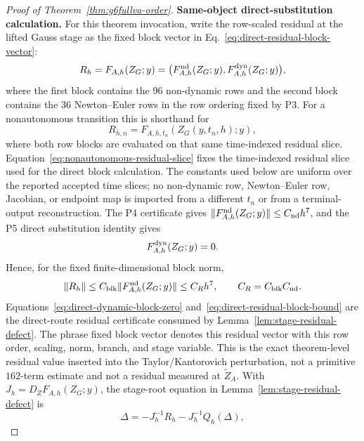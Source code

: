 \documentclass[preprint,12pt]{elsarticle}
\begin{document}
\begin{proof}[Proof of Theorem~\ref{thm:g6fullva-order}]
\noindent\textbf{Same-object direct-substitution calculation.}
For this theorem invocation, write the row-scaled residual at the lifted
Gauss stage as the fixed block vector in
Eq.~\eqref{eq:direct-residual-block-vector}:
\begin{equation}
\label{eq:direct-residual-block-vector}
  R_h=F_{A,h}(Z_G;y)
  =\big(F^{\rm nd}_{A,h}(Z_G;y),F^{\rm dyn}_{A,h}(Z_G;y)\big),
\end{equation}
where the first block contains the 96 non-dynamic rows and the second block
contains the 36 Newton--Euler rows in the row ordering fixed by P3.
For a nonautonomous transition this is shorthand for
\begin{equation}
\label{eq:nonautonomous-residual-slice}
  R_{h,n}=F_{A,h,t_n}(Z_G(y,t_n,h);y),
\end{equation}
where both row blocks are evaluated on that same time-indexed residual
slice.  Equation~\eqref{eq:nonautonomous-residual-slice} fixes the
time-indexed residual slice used for the direct block calculation.
The constants used below are uniform over the reported accepted time slices;
no non-dynamic row, Newton--Euler row, Jacobian, or endpoint map is imported
from a different \(t_n\) or from a terminal-output reconstruction.  The P4
certificate gives
\(\|F^{\rm nd}_{A,h}(Z_G;y)\|\le C_{\rm nd}h^7\), and the P5 direct
substitution identity gives
\begin{equation}
\label{eq:direct-dynamic-block-zero}
  F^{\rm dyn}_{A,h}(Z_G;y)=0 .
\end{equation}
Hence, for the fixed finite-dimensional block norm,
\begin{equation}
\label{eq:direct-residual-block-bound}
  \|R_h\|
  \le C_{\rm blk}\|F^{\rm nd}_{A,h}(Z_G;y)\|
  \le C_R h^7 ,
  \qquad C_R=C_{\rm blk}C_{\rm nd}.
\end{equation}
Equations~\eqref{eq:direct-dynamic-block-zero}
and~\eqref{eq:direct-residual-block-bound} are the direct-route residual
certificate consumed by Lemma~\ref{lem:stage-residual-defect}.
The phrase fixed block vector denotes this residual vector with this row
order, scaling, norm, branch, and stage variable.
This is the exact theorem-level residual value inserted into the
Taylor/Kantorovich perturbation, not a primitive \(162\)-term estimate and
not a residual measured at \(\widetilde Z_A\).  With
\(J_h=D_ZF_{A,h}(Z_G;y)\), the stage-root equation in
Lemma~\ref{lem:stage-residual-defect} is
\begin{equation}
\label{eq:stage-root-equation}
  \Delta=-J_h^{-1}R_h-J_h^{-1}Q_h(\Delta),

\end{equation}
\end{proof}
\end{document}
